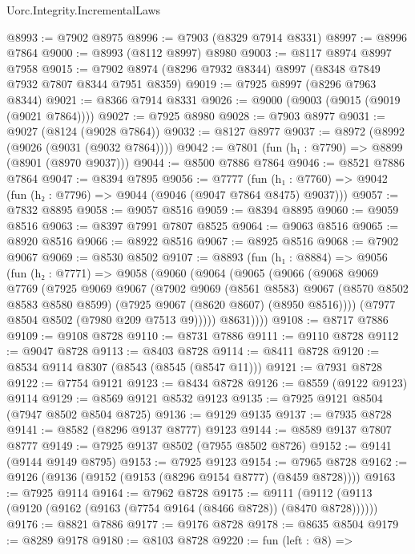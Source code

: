 \begin{lexlean}{Uorc.Integrity.IncrementalLaws}
\begin{coremodule}
@8993 := @7902 @8975
@8996 := @7903 (@8329 @7914 @8331)
@8997 := @8996 @7864
@9000 := @8993 (@8112 @8997) @8980
@9003 := @8117 @8974 @8997 @7958
@9015 := @7902 @8974 (@8296 @7932 @8344) @8997 (@8348 @7849 @7932 @7807 @8344 @7951 @8359)
@9019 := @7925 @8997 (@8296 @7963 @8344)
@9021 := @8366 @7914 @8331
@9026 := @9000 (@9003 (@9015 (@9019 (@9021 @7864))))
@9027 := @7925 @8980
@9028 := @7903 @8977
@9031 := @9027 (@8124 (@9028 @7864))
@9032 := @8127 @8977
@9037 := @8972 (@8992 (@9026 (@9031 (@9032 @7864))))
@9042 := @7801 (fun (h₁ : @7790) => @8899 (@8901 (@8970 @9037)))
@9044 := @8500 @7886 @7864
@9046 := @8521 @7886 @7864
@9047 := @8394 @7895
@9056 := @7777
    (fun (h₁ : @7760) => @9042 (fun (h₂ : @7796) => @9044 (@9046 (@9047 @7864 @8475) @9037)))
@9057 := @7832 @8895
@9058 := @9057 @8516
@9059 := @8394 @8895
@9060 := @9059 @8516
@9063 := @8397 @7991 @7807 @8525
@9064 := @9063 @8516
@9065 := @8920 @8516
@9066 := @8922 @8516
@9067 := @8925 @8516
@9068 := @7902 @9067
@9069 := @8530 @8502
@9107 := @8893
    (fun (h₁ : @8884) =>
    @9056
      (fun (h₂ : @7771) =>
      @9058
        (@9060
          (@9064
            (@9065
              (@9066
                (@9068
                  @9069
                  @7769
                  (@7925
                    @9069
                    @9067
                    (@7902
                      @9069
                      (@8561 @8583)
                      @9067
                      (@8570 @8502 @8583 @8580 @8599)
                      (@7925 @9067 (@8620 @8607) (@8950 @8516))))
                  (@7977 @8504 @8502 (@7980 @209 @7513 @9)))))
            @8631))))
@9108 := @8717 @7886
@9109 := @9108 @8728
@9110 := @8731 @7886
@9111 := @9110 @8728
@9112 := @9047 @8728
@9113 := @8403 @8728
@9114 := @8411 @8728
@9120 := @8534 @9114 @8307 (@8543 (@8545 (@8547 @11)))
@9121 := @7931 @8728
@9122 := @7754 @9121
@9123 := @8434 @8728
@9126 := @8559 (@9122 @9123) @9114
@9129 := @8569 @9121 @8532 @9123
@9135 := @7925 @9121 @8504 (@7947 @8502 @8504 @8725)
@9136 := @9129 @9135
@9137 := @7935 @8728
@9141 := @8582 (@8296 @9137 @8777) @9123
@9144 := @8589 @9137 @7807 @8777
@9149 := @7925 @9137 @8502 (@7955 @8502 @8726)
@9152 := @9141 (@9144 @9149 @8795)
@9153 := @7925 @9123
@9154 := @7965 @8728
@9162 := @9126 (@9136 (@9152 (@9153 (@8296 @9154 @8777) (@8459 @8728))))
@9163 := @7925 @9114
@9164 := @7962 @8728
@9175 := @9111 (@9112 (@9113 (@9120 (@9162 (@9163 (@7754 @9164 (@8466 @8728)) (@8470 @8728))))))
@9176 := @8821 @7886
@9177 := @9176 @8728
@9178 := @8635 @8504
@9179 := @8289 @9178
@9180 := @8103 @8728
@9220 := fun (left : @8) =>

\end{coremodule}
\end{lexlean}
